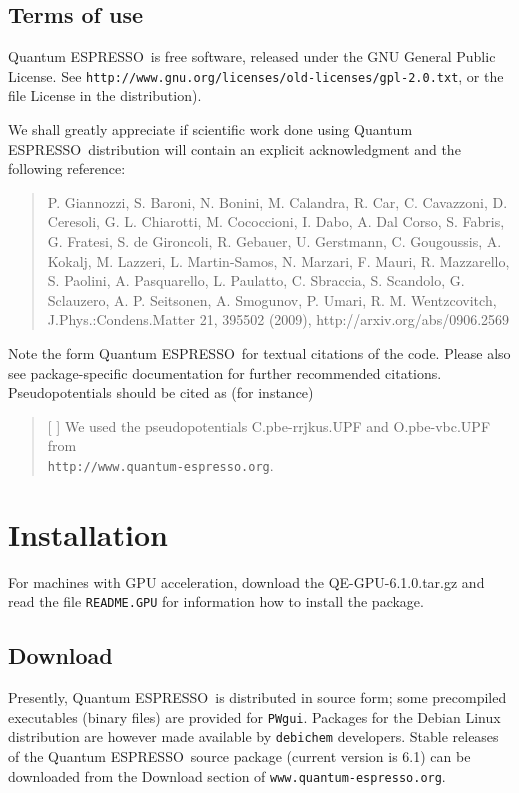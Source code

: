 \documentclass[12pt,a4paper]{article}
\def\version{6.1}
\def\qe{{\sc Quantum ESPRESSO}}
\begin{document}
\subsection{Terms of use}
\label{SubSec:Terms}

\qe\ is free software, released under the
GNU General Public License. See
\texttt{http://www.gnu.org/licenses/old-licenses/gpl-2.0.txt},
or the file License in the distribution).

We shall greatly appreciate if scientific work done using \qe\ distribution will
contain an explicit acknowledgment and the following reference:
\begin{quote}
P. Giannozzi, S. Baroni, N. Bonini, M. Calandra, R. Car, C. Cavazzoni,
D. Ceresoli, G. L. Chiarotti, M. Cococcioni, I. Dabo, A. Dal Corso,
S. Fabris, G. Fratesi, S. de Gironcoli, R. Gebauer, U. Gerstmann,
C. Gougoussis, A. Kokalj, M. Lazzeri, L. Martin-Samos, N. Marzari,
F. Mauri, R. Mazzarello, S. Paolini, A. Pasquarello, L. Paulatto,
C. Sbraccia, S. Scandolo, G. Sclauzero, A. P. Seitsonen, A. Smogunov,
P. Umari, R. M. Wentzcovitch, J.Phys.:Condens.Matter 21, 395502 (2009),
http://arxiv.org/abs/0906.2569
\end{quote}
Note the form \qe\ for textual citations of the code.
Please also see package-specific documentation for
further recommended citations.
Pseudopotentials should be cited as (for instance)
\begin{quote}
[ ] We used the pseudopotentials C.pbe-rrjkus.UPF
and O.pbe-vbc.UPF from\\
\texttt{http://www.quantum-espresso.org}.
\end{quote}
\section{Installation}

For machines with GPU acceleration, download the QE-GPU-\version.0.tar.gz and read
the file \texttt{README.GPU} for information how to install the package.

\subsection{Download}
\label{SubSec:Download}

Presently, \qe\ is distributed in source form; some precompiled
executables (binary files) are provided for \texttt{PWgui}.
Packages for the Debian Linux distribution are however
made available by \texttt{debichem} developers.
Stable releases of the \qe\ source package (current version
is \version) can be downloaded from the Download section
of \texttt{www.quantum-espresso.org}.
\end{document}
